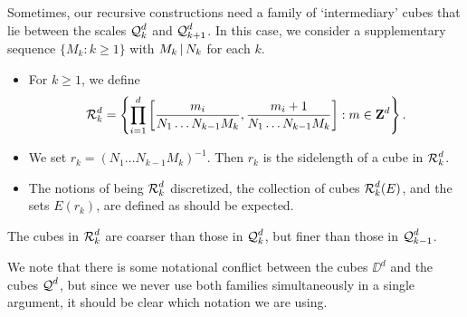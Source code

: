 %
Sometimes, our recursive constructions need a family of `intermediary' cubes that lie between the scales $\operatorname{\mathcal{Q}}_k^d$ and $\operatorname{\mathcal{Q}}_{k+1}^d$. In this case, we consider a supplementary sequence $\{ M_k : k \geq 1 \}$ with $M_k \operatorname{\mid} N_k$ for each $k$.
%
\begin{itemize}
	\item For $k \geq 1$, we define
	\[ \operatorname{\mathcal{R}}_k^d = \left\{ \prod_{i = 1}^d \left[ \frac{m_i}{N_1 \dots N_{k-1} M_k} , \frac{m_i + 1}{N_1 \dots N_{k-1} M_k} \right] : m \in \mathbf{Z}^d \right\}. \]

	\item We set $r_k = (N_1 \dots N_{k-1} M_k)^{-1}$. Then $r_k$ is the sidelength of a cube in $\operatorname{\mathcal{R}}_k^d$.

	\item The notions of being $\operatorname{\mathcal{R}}_k^d$ discretized, the collection of cubes $\operatorname{\mathcal{R}}_k^d(E)$, and the sets $E(r_k)$, are defined as should be expected.
\end{itemize}
%
The cubes in $\operatorname{\mathcal{R}}_k^d$ are coarser than those in $\operatorname{\mathcal{Q}}_k^d$, but finer than those in $\operatorname{\mathcal{Q}}_{k-1}^d$.

\begin{remark}
	We note that there is some notational conflict between the cubes $\DD^d$ and the cubes $\operatorname{\mathcal{Q}}^d$, but since we never use both families simultaneously in a single argument, it should be clear which notation we are using.
\end{remark}

%
%
%
%


